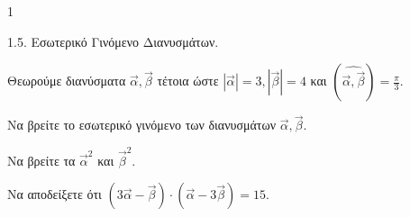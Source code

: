 \begin{ylh}{1}
    \item 1.5. Εσωτερικό Γινόμενο Διανυσμάτων.
\end{ylh}
Θεωρούμε διανύσματα $\vec{α}, \vec{β}$ τέτοια ώστε $|\vec{α}| = 3, |\vec{β}| = 4$ και $(\widehat{\vec{α}, \vec{β}}) = \frac{\pi}{3}$.
\begin{alist}
    \item Να βρείτε το εσωτερικό γινόμενο των διανυσμάτων $\vec{α}, \vec{β}$. 
    \item Να βρείτε τα $\vec{α}^2$ και $\vec{β}^2$. 
    \item Να αποδείξετε ότι $(3\vec{α} - \vec{β}) \cdot (\vec{α} - 3\vec{β}) = 15$. 
\end{alist}